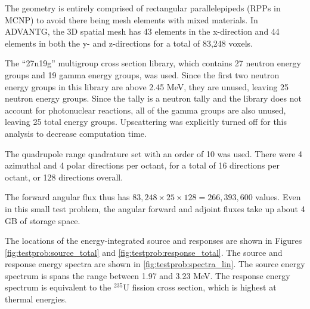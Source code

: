 The geometry is entirely comprised of rectangular parallelepipeds (RPPs in MCNP) to avoid there being mesh elements with mixed materials.
In ADVANTG, the 3D spatial mesh has 43 elements in the x-direction and 44 elements in both the y- and z-directions for a total of 83,248 voxels.

The ``27n19g'' multigroup cross section library, which contains 27 neutron energy groups and 19 gamma energy groups, was used.
Since the first two neutron energy groups in this library are above 2.45 MeV, they are unused, leaving 25 neutron energy groups.
Since the tally is a neutron tally and the library does not account for photonuclear reactions, all of the gamma groups are also unused, leaving 25 total energy groups.
Upscattering was explicitly turned off for this analysis to decrease computation time.

The quadrupole range quadrature set with an order of 10 was used.
There were 4 azimuthal and 4 polar directions per octant, for a total of 16 directions per octant, or 128 directions overall.

The forward angular flux thus has $83,248 \times 25 \times 128 = 266,393,600$ values.
Even in this small test problem, the angular forward and adjoint fluxes take up about 4 GB of storage space.

The locations of the energy-integrated source and responses are shown in Figures \ref{fig:testprob:source_total} and \ref{fig:testprob:response_total}.
The source and response energy spectra are shown in \ref{fig:testprob:spectra_lin}.
The source energy spectrum is spans the range between 1.97 and 3.23 MeV.
The response energy spectrum is equivalent to the ${}^{235}\text{U}$ fission cross section, which is highest at thermal energies.

